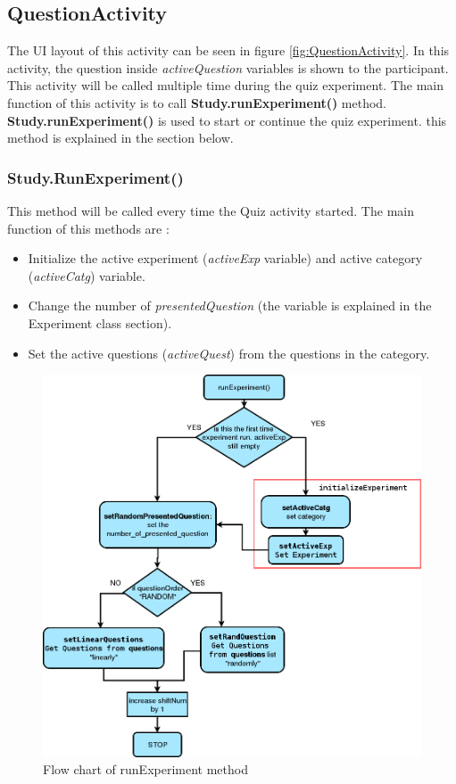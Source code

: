 \subsection{QuestionActivity}
The UI layout of this activity can be seen in figure \ref{fig:QuestionActivity}.
In this activity, the question inside \textit{activeQuestion} variables is shown to the participant.
This activity will be called multiple time during the quiz experiment.
The main function of this activity is to call \textbf{Study.runExperiment()} method.
\textbf{Study.runExperiment()} is used to start or continue the quiz experiment.
this method is explained in the section below.

\subsubsection{Study.RunExperiment()}
This method will be called every time the Quiz activity started.
The main function of this methods are :
\begin{itemize}
\item Initialize the active experiment (\textit{activeExp} variable) and active category (\textit{activeCatg}) variable.
\item Change the number of \textit{presentedQuestion} (the variable is explained in the Experiment class section).
\item Set the active questions (\textit{activeQuest}) from the questions in the category.
\end{itemize}


\begin{figure}
\begin{center}
\includegraphics[scale=0.45]{runExperiment}
\end{center}
\caption{Flow chart of runExperiment method}
\label{fig:runExperiment_flow}
\end{figure}


